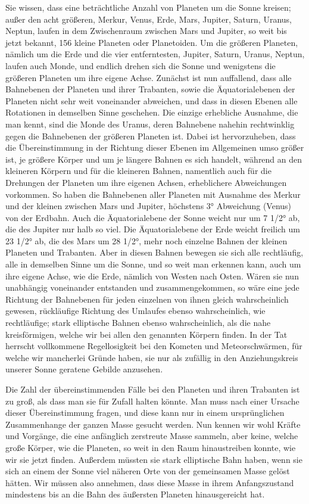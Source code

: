 \documentclass[a4paper, 11pt, oneside, german]{article}
\begin{document}
Sie wissen, dass eine beträchtliche Anzahl von Planeten um die Sonne kreisen; außer den acht größeren, Merkur, Venus, Erde, Mars, Jupiter, Saturn, Uranus, Neptun, laufen in dem Zwischenraum zwischen Mars und Jupiter, so weit bis jetzt bekannt, 156 kleine Planeten oder Planetoiden. Um die größeren Planeten, nämlich um die Erde und die vier entferntesten, Jupiter, Saturn, Uranus, Neptun, laufen auch Monde, und endlich drehen sich die Sonne und wenigstens die größeren Planeten um ihre eigene Achse. Zunächst ist nun auffallend, dass alle Bahnebenen der Planeten und ihrer Trabanten, sowie die Äquatorialebenen der Planeten nicht sehr weit voneinander abweichen, und dass in diesen Ebenen alle Rotationen in demselben Sinne geschehen. Die einzige erhebliche Ausnahme, die man kennt, sind die Monde des Uranus, deren Bahnebene nahehin rechtwinklig gegen die Bahnebenen der größeren Planeten ist. Dabei ist hervorzuheben, dass die Übereinstimmung in der Richtung dieser Ebenen im Allgemeinen umso größer ist, je größere Körper und um je längere Bahnen es sich handelt, während an den kleineren Körpern und für die kleineren Bahnen, namentlich auch für die Drehungen der Planeten um ihre eigenen Achsen, erheblichere Abweichungen vorkommen. So haben die Bahnebenen aller Planeten mit Ausnahme des Merkur und der kleinen zwischen Mars und Jupiter, höchstens 3° Abweichung (Venus) von der Erdbahn. Auch die Äquatorialebene der Sonne weicht nur um 7 1/2° ab, die des Jupiter nur halb so viel. Die Äquatorialebene der Erde weicht freilich um 23 1/2° ab, die des Mars um 28 1/2°, mehr noch einzelne Bahnen der kleinen Planeten und Trabanten. Aber in diesen Bahnen bewegen sie sich alle rechtläufig, alle in demselben Sinne um die Sonne, und so weit man erkennen kann, auch um ihre eigene Achse, wie die Erde, nämlich von Westen nach Osten. Wären sie nun unabhängig voneinander entstanden und zusammengekommen, so wäre eine jede Richtung der Bahnebenen für jeden einzelnen von ihnen gleich wahrscheinlich gewesen, rückläufige Richtung des Umlaufes ebenso wahrscheinlich, wie rechtläufige; stark elliptische Bahnen ebenso wahrscheinlich, als die nahe kreisförmigen, welche wir bei allen den genannten Körpern finden. In der Tat herrscht vollkommene Regellosigkeit bei den Kometen und Meteorschwärmen, für welche wir mancherlei Gründe haben, sie nur als zufällig in den Anziehungskreis unserer Sonne geratene Gebilde anzusehen.

Die Zahl der übereinstimmenden Fälle bei den Planeten und ihren Trabanten ist zu groß, als dass man sie für Zufall halten könnte. Man muss nach einer Ursache dieser Übereinstimmung fragen, und diese kann nur in einem ursprünglichen Zusammenhange der ganzen Masse gesucht werden. Nun kennen wir wohl Kräfte und Vorgänge, die eine anfänglich zerstreute Masse sammeln, aber keine, welche große Körper, wie die Planeten, so weit in den Raum hinaustreiben konnte, wie wir sie jetzt finden. Außerdem müssten sie stark elliptische Bahn haben, wenn sie sich an einem der Sonne viel näheren Orte von der gemeinsamen Masse gelöst hätten. Wir müssen also annehmen, dass diese Masse in ihrem Anfangszustand mindestens bis an die Bahn des äußersten Planeten hinausgereicht hat.
\end{document}
